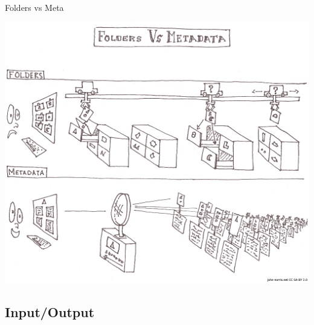 \documentclass[compress,11pt,xcolor=svgnames,aspectratio=169]{beamer}
\begin{document}
\begin{frame}[t]{Folders vs Meta}

\begin{center}
\includegraphics[scale=0.6]{fig/FoldersVsMeta}
\end{center}

\end{frame}

\subsection{Input/Output}
\end{document}

